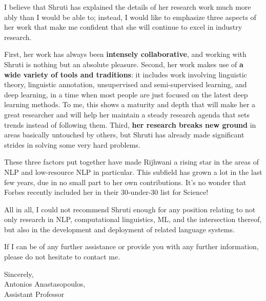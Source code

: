 \documentclass[10pt]{letter}
\begin{document}
I believe that Shruti has explained the details of her research work much more ably than I would be able to; instead, I would like to emphasize three aspects of her work that make me confident that she will continue to excel in industry research.

First, her work has always been \textbf{intensely collaborative}, and working with Shruti is nothing but an absolute pleasure. Second, her work makes use of \textbf{a wide variety of tools and traditions}: it includes work involving linguistic theory, linguistic annotation, unsupervised and semi-supervised learning, and deep learning, in a time when most people are just focused on the latest deep learning methods. To me, this shows a maturity and depth that will make her a great researcher and will help her maintain a steady research agenda that sets trends instead of following them. Third, \textbf{her research breaks new ground} in areas basically untouched by others, but Shruti has already made significant strides in solving some very hard problems.

These three factors put together have made Rijhwani a rising star in the areas of NLP and low-resource NLP in particular. This subfield has grown a lot in the last few years, due in no small part to her own contributions. It's no wonder that Forbes recently included her in their 30-under-30 list for Science! 

All in all, I could not recommend Shruti enough for any position relating to not only research in NLP, computational linguistics, ML, and the intersection thereof, but also in the development and deployment of related language systems.

If I can be of any further assistance or provide you with any further information, please do not hesitate to contact me.

Sincerely,\\
Antonios Anastasopoulos,\\
Assistant Professor
\end{document}
